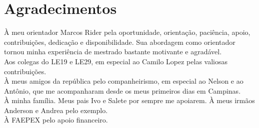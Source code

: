 \chapter*{Agradecimentos}%


À meu orientador Marcos Rider pela oportunidade, orientação, paciência, apoio, contribuições, dedicação e disponibilidade. Sua abordagem como orientador tornou minha experiência de mestrado bastante motivante e agradável. \\
Aos colegas do LE19 e LE29, em especial ao Camilo Lopez pelas valiosas contribuições.\\
À meus amigos da república pelo companheirismo, em especial ao Nelson e ao Antônio, que me acompanharam desde os meus primeiros dias em Campinas. \\
À minha família. Meus pais Ivo e Salete por sempre me apoiarem. À meus irmãos Anderson e Andrea pelo exemplo.\\
À FAEPEX pelo apoio financeiro.



